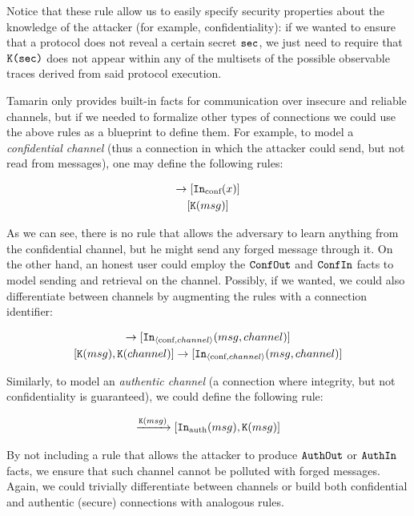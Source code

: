 \documentclass{article}
\newcommand{\mono}[1]{\textrm{\tt #1}}
\begin{document}
Notice that these rule allow us to easily specify security properties about the knowledge of the attacker (for example, confidentiality): if we wanted to ensure that a protocol does not reveal a certain secret $\mono{sec}$, we just need to require that $\mono{K(sec)}$ does not appear within any of the multisets of the possible observable traces derived from said protocol execution.

Tamarin only provides built-in facts for communication over insecure and reliable channels, but if we needed to formalize other types of connections we could use the above rules as a blueprint to define them. For example, to model a \textit{confidential channel} (thus a connection in which the attacker could send, but not read from messages), one may define the following rules:

\begin{gather*}
    [ \mono{Out}_{\textrm{conf}}(msg)] \to [ \mono{In}_{\textrm{conf}}(x) ]\\
    [ \mono{K}(msg)]
\end{gather*}

As we can see, there is no rule that allows the adversary to learn anything from the confidential channel, but he might send any forged message through it. On the other hand, an honest user could employ the $\mono{ConfOut}$ and $\mono{ConfIn}$ facts to model sending and retrieval on the channel. Possibly, if we wanted, we could also differentiate between channels by augmenting the rules with a connection identifier:

\begin{gather*}
    [\mono{Out}_{\langle \textrm{conf}, channel \rangle}(msg, channel)] \to [\mono{In}_{\langle \textrm{conf}, channel \rangle}(msg, channel)]\\
    [\mono{K}(msg), \mono{K}(channel)] \to [\mono{In}_{\langle \textrm{conf}, channel \rangle}(msg, channel)]
\end{gather*}

Similarly, to model an \textit{authentic channel} (a connection where integrity, but not confidentiality is guaranteed), we could define the following rule:

\begin{equation*}
    [\mono{Out}_{\textrm{auth}}(msg)] \xrightarrow{\mono{K}(msg)} [\mono{In}_{\textrm{auth}}(msg), \mono{K}(msg)]
\end{equation*}

By not including a rule that allows the attacker to produce $\mono{AuthOut}$ or $\mono{AuthIn}$ facts, we ensure that such channel cannot be polluted with forged messages. Again, we could trivially differentiate between channels or build both confidential and authentic (secure) connections with analogous rules.
\end{document}
